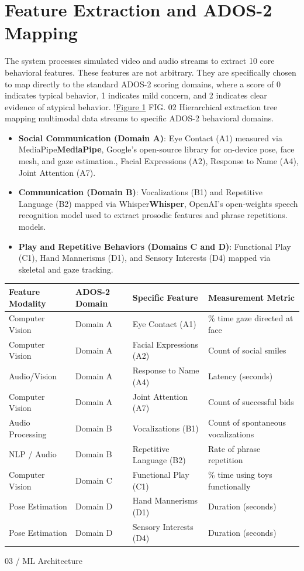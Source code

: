 \documentclass{obelus-preprint}
\begin{document}
\section{Feature Extraction and ADOS-2 Mapping}
The system processes simulated video and audio streams to extract 10 core behavioral features. These features are not arbitrary. They are specifically chosen to map directly to the standard ADOS-2 scoring domains, where a score of 0 indicates typical behavior, 1 indicates mild concern, and 2 indicates clear evidence of atypical behavior.
!\href{fig_1.svg}{Figure 1}
FIG. 02 Hierarchical extraction tree mapping multimodal data streams to specific ADOS-2 behavioral domains.
\begin{itemize}[leftmargin=*]
  \item \textbf{Social Communication (Domain A)}: Eye Contact (A1) measured via MediaPipe\textbf{MediaPipe}, Google's open-source library for on-device pose, face mesh, and gaze estimation., Facial Expressions (A2), Response to Name (A4), Joint Attention (A7).
  \item \textbf{Communication (Domain B)}: Vocalizations (B1) and Repetitive Language (B2) mapped via Whisper\textbf{Whisper}, OpenAI's open-weights speech recognition model used to extract prosodic features and phrase repetitions. models.
  \item \textbf{Play and Repetitive Behaviors (Domains C and D)}: Functional Play (C1), Hand Mannerisms (D1), and Sensory Interests (D4) mapped via skeletal and gaze tracking.
\end{itemize}
\begin{center}
\begin{tabular}{llll}
\toprule
\textbf{Feature Modality} & \textbf{ADOS-2 Domain} & \textbf{Specific Feature} & \textbf{Measurement Metric} \\
\midrule
Computer Vision & Domain A & Eye Contact (A1) & \% time gaze directed at face \\
Computer Vision & Domain A & Facial Expressions (A2) & Count of social smiles \\
Audio/Vision & Domain A & Response to Name (A4) & Latency (seconds) \\
Computer Vision & Domain A & Joint Attention (A7) & Count of successful bids \\
Audio Processing & Domain B & Vocalizations (B1) & Count of spontaneous vocalizations \\
NLP / Audio & Domain B & Repetitive Language (B2) & Rate of phrase repetition \\
Computer Vision & Domain C & Functional Play (C1) & \% time using toys functionally \\
Pose Estimation & Domain D & Hand Mannerisms (D1) & Duration (seconds) \\
Pose Estimation & Domain D & Sensory Interests (D4) & Duration (seconds) \\
\bottomrule
\end{tabular}
\end{center}
03 / ML Architecture
\end{document}
